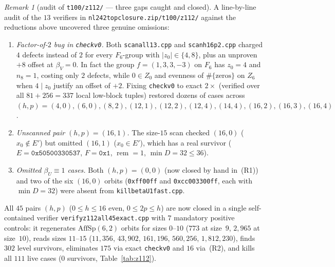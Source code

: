 \documentclass[11pt]{article}
\theoremstyle{definition}
\theoremstyle{remark}
\newtheorem{remark}[theorem]{Remark}
\newcommand{\code}[1]{\texttt{#1}}
\DeclareRobustCommand{\_}{\textunderscore\allowbreak}
\begin{document}
\begin{remark}[audit of \code{t100/z112/} --- three gaps caught and closed]\label{rem:z112-audit}
A line-by-line audit of the $13$ verifiers in \code{nl242\_top\_closure.zip/t100/z112/} against the reductions above uncovered three genuine omissions:
\begin{enumerate}[nosep]
\item \emph{Factor-of-$2$ bug in \code{check\_v0}.} Both \code{scan\_all\_11\_13.cpp} and \code{scan\_h16\_p2.cpp} charged $4$ defects instead of $2$ for every $F_6$-group with $|z_0|\in\{4,8\}$, plus an unproven $+8$ offset at $\beta_V=0$. In fact the group $f=(1,3,3,-3)$ on $F_6$ has $z_0=4$ and $n_8=1$, costing only $2$ defects, while $0\in Z_0$ and evenness of $\#\{\text{zeros}\}$ on $Z_6$ when $4\mid z_0$ justify an offset of $+2$. Fixing \code{check\_v0} to exact $2\times$ (verified over all $81+256=337$ local low-block tuples) restored dozens of cases across $(h,p)=(4,0),(6,0),(8,2),(12,1),(12,2),(12,4),(14,4),(16,2),(16,3),(16,4)$.
\item \emph{Unscanned pair $(h,p)=(16,1)$.} The size-$15$ scan checked $(16,0)$ ($x_0\notin E'$) but omitted $(16,1)$ ($x_0\in E'$), which has a real survivor ($E=\code{0x50500330537}$, $F=\code{0x1}$, $\operatorname{rem}=1$, $\min D=32\le36$).
\item \emph{Omitted $\beta_U\equiv1$ cases.} Both $(h,p)=(0,0)$ (now closed by hand in~(R1)) and two of the six $(16,0)$ orbits (\code{0xff00ff} and \code{0xcc003300ff}, each with $\min D=32$) were absent from \code{kill\_betaU1\_fast.cpp}.
\end{enumerate}
All $45$ pairs $(h,p)$ ($0\le h\le16$ even, $0\le2p\le h$) are now closed in a single self-contained verifier \code{verify\_z112\_all45\_exact.cpp} with $7$ mandatory positive controls: it regenerates $\mathrm{AffSp}(6,2)$ orbits for sizes $0$--$10$ ($773$ at size~$9$, $2{,}965$ at size~$10$), reads sizes $11$--$15$ ($11{,}356$, $43{,}902$, $161{,}196$, $560{,}256$, $1{,}812{,}230$), finds $302$ level survivors, eliminates $175$ via exact \code{check\_v0} and $16$ via~(R2), and kills all $111$ live cases ($0$ survivors, Table~\ref{tab:z112}).
\end{remark}
\end{document}
